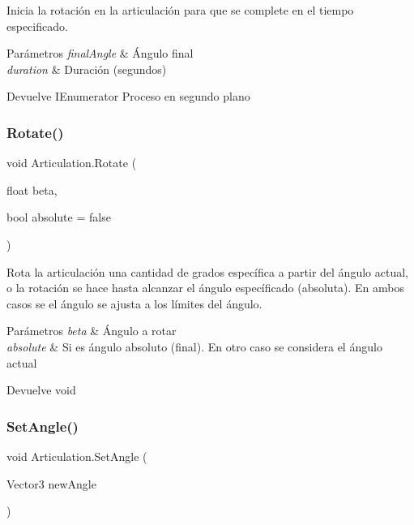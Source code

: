 Inicia la rotación en la articulación para que se complete en el tiempo especificado. 
\begin{DoxyParams}{Parámetros}
{\em final\+Angle} & Ángulo final \\
\hline
{\em duration} & Duración (segundos) \\
\hline
\end{DoxyParams}
\begin{DoxyReturn}{Devuelve}
I\+Enumerator Proceso en segundo plano 
\end{DoxyReturn}
\mbox{\label{class_articulation_ae796d06441aa563bf7ccfce5f201c26e}} 
\subsubsection{\texorpdfstring{Rotate()}{Rotate()}}
{\footnotesize\ttfamily void Articulation.\+Rotate (\begin{DoxyParamCaption}\item[{float}]{beta,  }\item[{bool}]{absolute = {\ttfamily false} }\end{DoxyParamCaption})\hspace{0.3cm}{\ttfamily [inline]}}

Rota la articulación una cantidad de grados específica a partir del ángulo actual, o la rotación se hace hasta alcanzar el ángulo específicado (absoluta). En ambos casos se el ángulo se ajusta a los límites del ángulo. 
\begin{DoxyParams}{Parámetros}
{\em beta} & Ángulo a rotar \\
\hline
{\em absolute} & Si es ángulo absoluto (final). En otro caso se considera el ángulo actual \\
\hline
\end{DoxyParams}
\begin{DoxyReturn}{Devuelve}
void 
\end{DoxyReturn}
\mbox{\label{class_articulation_a5091b1cabb19fb26e8937857bf0a3ac5}} 
\subsubsection{\texorpdfstring{SetAngle()}{SetAngle()}}
{\footnotesize\ttfamily void Articulation.\+Set\+Angle (\begin{DoxyParamCaption}\item[{Vector3}]{new\+Angle }\end{DoxyParamCaption})\hspace{0.3cm}{\ttfamily [inline]}}

